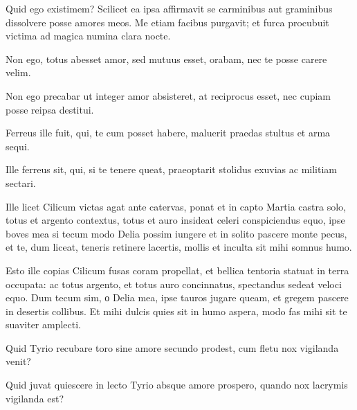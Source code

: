 \noindent Quid ego existimem? Scilicet ea ipsa affirmavit se carminibus aut graminibus dissolvere posse amores meos. Me etiam facibus purgavit; et furca procubuit victima ad magica numina clara nocte.  \\

{\large

\noindent Non ego, totus abesset amor, sed mutuus esset, orabam, nec te posse carere velim.\\

}


\noindent Non ego precabar ut integer amor absisteret, at reciprocus esset, nec cupiam posse reipsa destitui. \\

{\large

\noindent Ferreus ille fuit, qui, te cum posset habere, maluerit praedas stultus et arma sequi.\\

}


\noindent Ille ferreus sit, qui, si te tenere queat, praeoptarit stolidus exuvias ac militiam sectari. \\

{\large

\noindent Ille licet Cilicum victas agat ante catervas, ponat et in capto Martia castra solo, totus et argento contextus, totus et auro insideat celeri conspiciendus equo, ipse boves mea si tecum modo Delia possim iungere et in solito pascere monte pecus, et te, dum liceat, teneris retinere lacertis, mollis et inculta sit mihi somnus humo.\\

}


\noindent Esto ille copias Cilicum fusas coram propellat, et bellica tentoria statuat in terra occupata: ac totus argento, et totus auro concinnatus, spectandus sedeat veloci equo. Dum tecum sim, о Delia mea, ipse tauros jugare queam, et gregem pascere in desertis collibus. Et mihi dulcis quies sit in humo aspera, modo fas mihi sit te suaviter amplecti. \\

{\large

\noindent Quid Tyrio recubare toro sine amore secundo prodest, cum fletu nox vigilanda venit?\\

}


\noindent Quid juvat quiescere in lecto Tyrio absque amore prospero, quando nox lacrymis vigilanda est? \\

